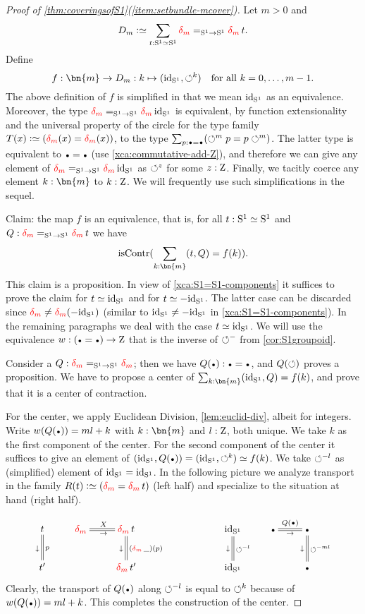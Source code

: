 \begin{proof}[Proof of \cref{thm:coveringsofS1}(\ref{item:setbundle-mcover})]
Let $m>0$ and $$D_m\defequi\sum_{t:\Sc\equiv\Sc} \dg{m} =_{\Sc\to\Sc} \dg{m} t.$$
Define 
\[
f: \bn{m} \to D_m: k \mapsto (\id_\Sc,{\Sloop}^k)\quad\text{for all $k=0,\ldots,m-1$}.
\]
The above definition of $f$ is simplified in that we mean $\mathord{\mathrm{id}}_{\mathrm{S}^1}$
as an equivalence. Moreover, the type $\dg{m} =_{\Sc\to\Sc} \dg{m} \id_\Sc$ is equivalent,
by function extensionality and the universal property of the circle for 
the type family $T(x)\defeq (\dg{m}(x) = \dg{m}(x))$, to the type 
$\sum_{p: \base=\base} (\Sloop^m p = p \Sloop^m)$.
The latter type is equivalent to $\base=\base$ (use \cref{xca:commutative-add-Z}), and therefore
we can give any element of $\dg{m} =_{\Sc\to\Sc} \dg{m} \id_\Sc$ as $\circlearrowleft^z$ for some $z:\mathrm{Z}$.
Finally, we tacitly coerce any element $k:\bn{m}$ to $k:\mathrm{Z}$.
We will frequently use such simplifications in the sequel.

Claim: the map $f$ is an equivalence, that is,
for all $t:{\mathrm{S}^1}\simeq{\mathrm{S}^1}$ and $Q : \dg{m} =_{\Sc\to\Sc} \dg{m} t$ we have
\[
\iscontr(\sum_{k:\bn{m}} (t,Q) = f(k)).
\]
This claim is a proposition.
In view of \cref{xca:S1=S1-components} it suffices to prove the claim
for $t\jdeq\id_\Sc$ and for $t\jdeq -\id_\Sc$. The latter case can be discarded
since $\dg{m} \neq \dg{m} (-\id_\Sc)$ 
(similar to $\mathord{\mathrm{id}}_{\mathrm{S}^1} \neq -\mathord{\mathrm{id}}_{\mathrm{S}^1}$ in \cref{xca:S1=S1-components}).
In the remaining paragraphs we deal with the case $t\jdeq\id_\Sc$.
We will use the equivalence $w: (\base=\base)\to\zet$ that
is the inverse of ${\circlearrowleft}^{-}$ from \cref{cor:S1groupoid}.

Consider a $Q: \dg{m} =_{\Sc\to\Sc} \dg{m}$; then we have $Q(\base): \base=\base$,
and $Q(\circlearrowleft)$ proves a proposition. 
We have to propose a center of $\sum_{k:\bn{m}} (\id_\Sc,Q) = f(k)$, 
and prove that it is a center of contraction.

For the center, we apply Euclidean Division, \cref{lem:euclid-div}, albeit for integers.
Write $w(Q(\base)) = ml+k$ with $k:\bn{m}$ and $l:\mathrm{Z}$, both unique.
We take $k$ as the first component of the center.
For the second component of the center it suffices to give an element of 
$(\id_\Sc,Q(\base))=(\id_\Sc,{\Sloop}^k)\jdeq f(k)$. 
We take ${\circlearrowleft}^{-l}$ as (simplified) element of $\mathord{\mathrm{id}}_{\mathrm{S}^1} = \mathord{\mathrm{id}}_{\mathrm{S}^1}$.
In the following picture we analyze transport in the family $R(t)\defeq(\dg{m} = \dg{m} t)$ 
(left half) and specialize to the situation at hand (right half).

\[
\xymatrix{
t\ar@{=}[d]^{p}_\downarrow
& \dg{m}\ar@{=}[r]^{X}_\rightarrow 
&\dg{m} t \ar@{=}[d]^{(\dg{m} \_)(p)}_\downarrow &&
&\id_\Sc\ar@{=}[d]^{{\Sloop}^{-l}}_\downarrow
& \base\ar@{=}[r]^{Q(\base)}_\rightarrow 
& \base\ar@{=}[d]^{{\Sloop}^{-ml}}_\downarrow 
\\
t'&&\dg{m} t' &&
&\id_\Sc   &&\base{\vphantom{t}}}
\]
Clearly, the transport of $Q(\base)$ along ${\circlearrowleft}^{-l}$ is 
equal to ${\circlearrowleft}^{k}$ because of $w(Q(\base)) = ml+k$.
This completes the construction of the center.


\end{proof}
